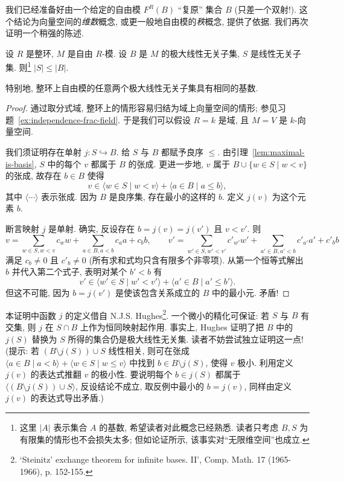 我们已经准备好由一个给定的自由模 $F^R(B)$ ``复原'' 集合 $B$ (只差一个双射!). 这个结论为向量空间的\emph{维数}概念, 或更一般地自由模的\emph{秩}概念, 提供了依据. 我们再次证明一个稍强的陈述.

\begin{proposition}\label{prop:independent-cardinality}
设 $R$ 是整环, $M$ 是自由 $R$-模. 设 $B$ 是 $M$ 的极大线性无关子集, $S$ 是线性无关子集. 则\footnote{这里 $|A|$ 表示集合 $A$ 的基数, 希望读者对此概念已经熟悉. 读者只考虑 $B,S$ 为有限集的情形也不会损失太多; 但如论证所示, 该事实对``无限维空间''也成立.} $|S|\le |B|$.

特别地, 整环上自由模的任意两个极大线性无关子集具有相同的基数.
\end{proposition}

\begin{proof}
通过取分式域, 整环上的情形容易归结为域上向量空间的情形; 参见习题~\ref{ex:independence-frac-field}. 于是我们可以假设 $R=k$ 是域, 且 $M=V$ 是 $k$-向量空间.

我们须证明存在单射 $j:S\hookrightarrow B$. 给 $S$ 与 $B$ 都赋予良序 $\le$. 由引理~\ref{lem:maximal-is-basis}, $S$ 中的每个 $v$ 都属于 $B$ 的张成. 更进一步地, $v$ 属于 $B\cup\{w\in S\mid w<v\}$ 的张成, 故存在 $b\in B$ 使得
\[
v \in \langle w\in S\mid w<v\rangle + \langle a\in B\mid a\le b\rangle,
\]
其中 $\langle\cdots\rangle$ 表示张成. 因为 $B$ 是良序集, 存在最小的这样的 $b$. 定义 $j(v)$ 为这个元素 $b$.

断言映射 $j$ 是单射. 确实, 反设存在 $b = j(v) = j(v')$ 且 $v < v'$. 则
\[
v = \sum_{w\in S, w<v} c_w w + \sum_{a\in B, a<b} c_a a + c_b b,\qquad v' = \sum_{w'\in S, w'<v'} c'_{w'} w' + \sum_{a'\in B, a'<b} c'_{a'} a' + c'_b b
\]
满足 $c_b\neq 0$ 且 $c'_b\neq 0$ (所有求和式均只含有限多个非零项). 从第一个恒等式解出 $b$ 并代入第二个式子, 表明对某个 $b'<b$ 有
\[
v' \in \langle w'\in S\mid w'<v'\rangle + \langle a'\in B\mid a'\le b'\rangle.
\]
但这不可能, 因为 $b=j(v')$ 是使该包含关系成立的 $B$ 中的最小元. 矛盾!
\end{proof}

本证明中函数 $j$ 的定义借自 N.J.S. Hughes\footnote{`Steinitz' exchange theorem for infinite bases. II', Comp. Math. 17 (1965-1966), p. 152-155.}. 一个微小的精化可保证: 若 $S$ 与 $B$ 有交集, 则 $j$ 在 $S\cap B$ 上作为恒同映射起作用.
事实上, Hughes 证明了把 $B$ 中的 $j(S)$ 替换为 $S$ 所得的集合仍是极大线性无关集. 读者不妨尝试独立证明这一点! (提示: 若 $(B\setminus j(S))\cup S$ 线性相关, 则可在张成 $\langle a\in B\mid a<b\rangle + \langle w\in S\mid w\le v\rangle$ 中找到 $b\in B\setminus j(S)$, 使得 $v$ 极小. 利用定义 $j(v)$ 的表达式推翻 $v$ 的极小性. 要说明每个 $b\in j(S)$ 都属于 $\langle(B\setminus j(S))\cup S\rangle$, 反设结论不成立, 取反例中最小的 $b=j(v)$, 同样由定义 $j(v)$ 的表达式导出矛盾.)

